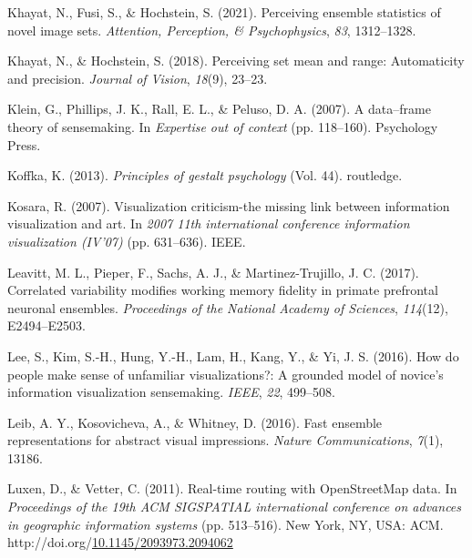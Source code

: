 \documentclass[print]{nuthesis}
\newlength{\cslhangindent}
\newenvironment{CSLReferences}[2]%
{\setlength{\parindent}{0pt}%
\everypar{\setlength{\hangindent}{\cslhangindent}}\ignorespaces}%
{\par}
\begin{document}
\begin{CSLReferences}{1}{0}
\leavevmode{}%
Khayat, N., Fusi, S., \& Hochstein, S. (2021). Perceiving ensemble statistics of novel image sets. \emph{Attention, Perception, \& Psychophysics}, \emph{83}, 1312--1328.

\leavevmode{}%
Khayat, N., \& Hochstein, S. (2018). Perceiving set mean and range: Automaticity and precision. \emph{Journal of Vision}, \emph{18}(9), 23--23.

\leavevmode{}%
Klein, G., Phillips, J. K., Rall, E. L., \& Peluso, D. A. (2007). A data--frame theory of sensemaking. In \emph{Expertise out of context} (pp. 118--160). Psychology Press.

\leavevmode{}%
Koffka, K. (2013). \emph{Principles of gestalt psychology} (Vol. 44). routledge.

\leavevmode{}%
Kosara, R. (2007). Visualization criticism-the missing link between information visualization and art. In \emph{2007 11th international conference information visualization (IV'07)} (pp. 631--636). IEEE.

\leavevmode{}%
Leavitt, M. L., Pieper, F., Sachs, A. J., \& Martinez-Trujillo, J. C. (2017). Correlated variability modifies working memory fidelity in primate prefrontal neuronal ensembles. \emph{Proceedings of the National Academy of Sciences}, \emph{114}(12), E2494--E2503.

\leavevmode{}%
Lee, S., Kim, S.-H., Hung, Y.-H., Lam, H., Kang, Y., \& Yi, J. S. (2016). How do people make sense of unfamiliar visualizations?: A grounded model of novice's information visualization sensemaking. \emph{IEEE}, \emph{22}, 499--508.

\leavevmode{}%
Leib, A. Y., Kosovicheva, A., \& Whitney, D. (2016). Fast ensemble representations for abstract visual impressions. \emph{Nature Communications}, \emph{7}(1), 13186.

\leavevmode{}%
Luxen, D., \& Vetter, C. (2011). Real-time routing with OpenStreetMap data. In \emph{Proceedings of the 19th ACM SIGSPATIAL international conference on advances in geographic information systems} (pp. 513--516). New York, NY, USA: ACM. http://doi.org/\href{https://doi.org/10.1145/2093973.2094062}{10.1145/2093973.2094062}


\end{CSLReferences}
\end{document}
